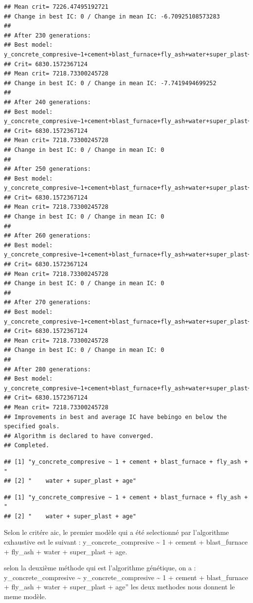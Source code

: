 \documentclass[
  12pt,
]{article}
\begin{document}
\begin{verbatim}
## Mean crit= 7226.47495192721
## Change in best IC: 0 / Change in mean IC: -6.70925108573283
## 
## After 230 generations:
## Best model: y_concrete_compresive~1+cement+blast_furnace+fly_ash+water+super_plast+age
## Crit= 6830.1572367124
## Mean crit= 7218.73300245728
## Change in best IC: 0 / Change in mean IC: -7.7419494699252
## 
## After 240 generations:
## Best model: y_concrete_compresive~1+cement+blast_furnace+fly_ash+water+super_plast+age
## Crit= 6830.1572367124
## Mean crit= 7218.73300245728
## Change in best IC: 0 / Change in mean IC: 0
## 
## After 250 generations:
## Best model: y_concrete_compresive~1+cement+blast_furnace+fly_ash+water+super_plast+age
## Crit= 6830.1572367124
## Mean crit= 7218.73300245728
## Change in best IC: 0 / Change in mean IC: 0
## 
## After 260 generations:
## Best model: y_concrete_compresive~1+cement+blast_furnace+fly_ash+water+super_plast+age
## Crit= 6830.1572367124
## Mean crit= 7218.73300245728
## Change in best IC: 0 / Change in mean IC: 0
## 
## After 270 generations:
## Best model: y_concrete_compresive~1+cement+blast_furnace+fly_ash+water+super_plast+age
## Crit= 6830.1572367124
## Mean crit= 7218.73300245728
## Change in best IC: 0 / Change in mean IC: 0
## 
## After 280 generations:
## Best model: y_concrete_compresive~1+cement+blast_furnace+fly_ash+water+super_plast+age
## Crit= 6830.1572367124
## Mean crit= 7218.73300245728
## Improvements in best and average IC have bebingo en below the specified goals.
## Algorithm is declared to have converged.
## Completed.
\end{verbatim}

\begin{verbatim}
## [1] "y_concrete_compresive ~ 1 + cement + blast_furnace + fly_ash + "
## [2] "    water + super_plast + age"
\end{verbatim}

\begin{verbatim}
## [1] "y_concrete_compresive ~ 1 + cement + blast_furnace + fly_ash + "
## [2] "    water + super_plast + age"
\end{verbatim}

Selon le critére aic, le premier modèle qui a été selectionné par
l'algorithme exhaustive est le suivant : y\_concrete\_compresive
\textasciitilde{} 1 + cement + blast\_furnace + fly\_ash + water +
super\_plast + age.

selon la deuxième méthode qui est l'algorithme génétique, on a :
y\_concrete\_compresive \textasciitilde{} y\_concrete\_compresive
\textasciitilde{} 1 + cement + blast\_furnace + fly\_ash + water +
super\_plast + age'' les deux methodes nous donnent le meme modèle.
\end{document}
